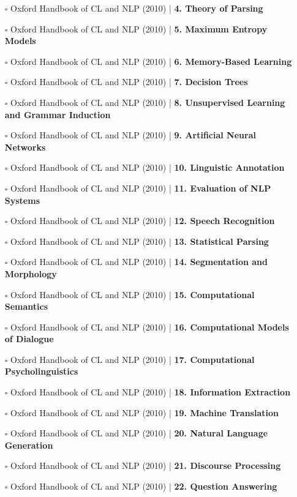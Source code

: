 \documentclass[a4, landscape, 12pt]{article}
\newcommand{\checkbox}{$\square$}%
\begin{document}
\begin{itemize}
{}
\item [\checkbox]  Oxford Handbook of CL and NLP (2010) | \textbf{ 4. Theory of Parsing
}
\item [\checkbox]  Oxford Handbook of CL and NLP (2010) | \textbf{ 5. Maximum Entropy Models
}
\item [\checkbox]  Oxford Handbook of CL and NLP (2010) | \textbf{ 6. Memory-Based Learning
}
\item [\checkbox]  Oxford Handbook of CL and NLP (2010) | \textbf{ 7. Decision Trees
}
\item [\checkbox]  Oxford Handbook of CL and NLP (2010) | \textbf{ 8. Unsupervised Learning and Grammar Induction
}
\item [\checkbox]  Oxford Handbook of CL and NLP (2010) | \textbf{ 9. Artificial Neural Networks
}
\item [\checkbox]  Oxford Handbook of CL and NLP (2010) | \textbf{ 10. Linguistic Annotation
}
\item [\checkbox]  Oxford Handbook of CL and NLP (2010) | \textbf{ 11. Evaluation of NLP Systems
}
\item [\checkbox]  Oxford Handbook of CL and NLP (2010) | \textbf{ 12. Speech Recognition
}
\item [\checkbox]  Oxford Handbook of CL and NLP (2010) | \textbf{ 13. Statistical Parsing
}
\item [\checkbox]  Oxford Handbook of CL and NLP (2010) | \textbf{ 14. Segmentation and Morphology
}
\item [\checkbox]  Oxford Handbook of CL and NLP (2010) | \textbf{ 15. Computational Semantics
}
\item [\checkbox]  Oxford Handbook of CL and NLP (2010) | \textbf{ 16. Computational Models of Dialogue
}
\item [\checkbox]  Oxford Handbook of CL and NLP (2010) | \textbf{ 17. Computational Psycholinguistics
}
\item [\checkbox]  Oxford Handbook of CL and NLP (2010) | \textbf{ 18. Information Extraction
}
\item [\checkbox]  Oxford Handbook of CL and NLP (2010) | \textbf{ 19. Machine Translation
}
\item [\checkbox]  Oxford Handbook of CL and NLP (2010) | \textbf{ 20. Natural Language Generation
}
\item [\checkbox]  Oxford Handbook of CL and NLP (2010) | \textbf{ 21. Discourse Processing
}
\item [\checkbox]  Oxford Handbook of CL and NLP (2010) | \textbf{ 22. Question Answering
}
\end{itemize}
\end{document}
